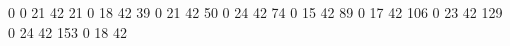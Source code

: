 0 0 21 42
21 0 18 42
39 0 21 42
50 0 24 42
74 0 15 42
89 0 17 42
106 0 23 42
129 0 24 42
153 0 18 42